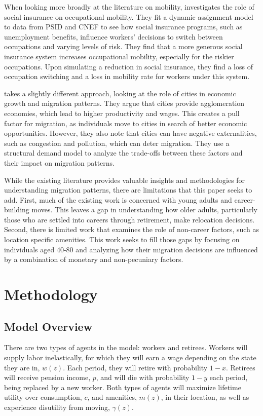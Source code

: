 \documentclass[11pt,a4paper]{article}
\begin{document}
When looking more broadly at the literature on mobility, \cite{cubas_social_2020} investigates the role of social insurance on occupational mobility. They fit a dynamic assignment model to data from PSID and CNEF to see how social insurance programs, such as unemployment benefits, influence workers' decisions to switch between occupations and varying levels of risk. They find that a more generous social insurance system increases occupational mobility, especially for the riskier occupations. Upon simulating a reduction in social insurance, they find a loss of occupation switching and a loss in mobility rate for workers under this system.

\cite{glaeser_cities_2001} takes a slightly different approach, looking at the role of cities in economic growth and migration patterns. They argue that cities provide agglomeration economies, which lead to higher productivity and wages. This creates a pull factor for migration, as individuals move to cities in search of better economic opportunities. However, they also note that cities can have negative externalities, such as congestion and pollution, which can deter migration. They use a structural demand model to analyze the trade-offs between these factors and their impact on migration patterns.

While the existing literature provides valuable insights and methodologies for understanding migration patterns, there are limitations that this paper seeks to add. First, much of the existing work is concerned with young adults and career-building moves. This leaves a gap in understanding how older adults, particularly those who are settled into careers through retirement, make relocation decisions. Second, there is limited work that examines the role of non-career factors, such as location specific amenities. This work seeks to fill those gaps by focusing on individuals aged 40-80 and analyzing how their migration decisions are influenced by a combination of monetary and non-pecuniary factors.

\section{Methodology}
\label{sec:methodology}

\subsection{Model Overview}
\label{subsec:formulation}

There are two types of agents in the model: workers and retirees. Workers will supply labor inelastically, for which they will earn a wage depending on the state they are in, $w(z)$. Each period, they will retire with probability $1-x$. Retirees will receive pension income, $p$, and will die with probability $1-y$ each period, being replaced by a new worker. Both types of agents will maximize lifetime utility over consumption, $c$, and amenities, $m(z)$, in their location, as well as experience disutility from moving, $\gamma(z)$. 
\end{document}
